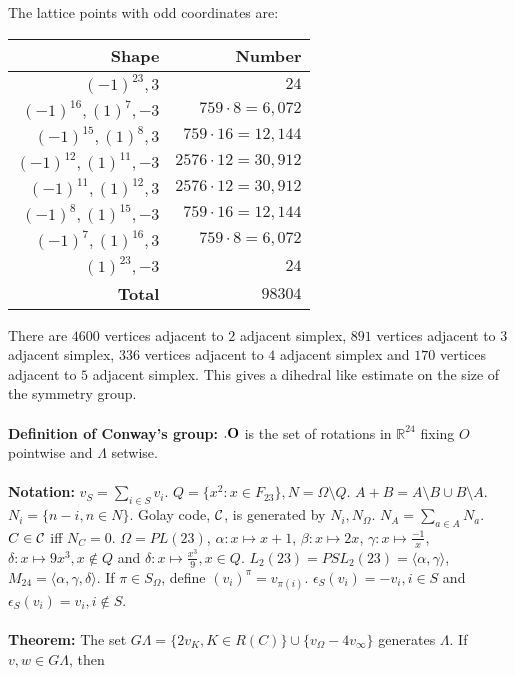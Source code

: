 The lattice points with odd coordinates are:
\begin{center}
\begin{tabular} {|r|r|}
\hline
{\bf Shape} & {\bf Number} \\
\hline
$(-1)^{23}, 3$ & $24$ \\
$(-1)^{16}, (1)^{7}, -3$ & $759 \cdot 8= 6,072$ \\
$(-1)^{15}, (1)^{8}, 3$ & $759 \cdot 16= 12,144$ \\
$(-1)^{12}, (1)^{11}, -3$ & $2576 \cdot 12= 30,912$ \\
$(-1)^{11}, (1)^{12}, 3$ & $2576 \cdot 12= 30,912$ \\
$(-1)^{8}, (1)^{15}, -3$ & $759 \cdot 16= 12,144$ \\
$(-1)^{7}, (1)^{16}, 3$ & $759 \cdot 8= 6,072$ \\
$(1)^{23}, -3$ & $24$ \\
\hline
{\bf Total} & $98304$\\
\hline
\end{tabular}
\end{center}
There are 
$4600$ vertices adjacent to $2$ adjacent simplex,
$891$ vertices adjacent to $3$ adjacent simplex,
$336$ vertices adjacent to $4$ adjacent simplex and
$170$ vertices adjacent to $5$ adjacent simplex.  
This gives a dihedral like estimate on the size of the symmetry group.
\\
\\
{\bf Definition of
Conway's group:} ${\bf .O}$ is the set of rotations in ${\mathbb R}^{24}$ fixing $O$ 
pointwise and $\Lambda$ setwise.
\\
\\
{\bf Notation:}
$v_S= \sum_{i \in S} v_i$. 
$Q= \{ x^2: x \in F_{23} \}, N= \Omega \setminus Q$.
$A+B= A \setminus B \cup B \setminus A$.  $N_i= \{ n-i, n \in N \}$.  Golay code,
${\cal C}$, is
generated by $N_i, N_{\Omega}$.  $N_A = \sum_{a \in A} N_a$.  $C \in {\cal C}$ iff $N_C=0$.
$\Omega= PL(23)$, $\alpha: x \mapsto x+1$, $\beta: x \mapsto 2x$,
$\gamma: x \mapsto {\frac {-1} x}$, 
$\delta: x \mapsto 9 x^3, x \notin Q$ and
$\delta: x \mapsto {\frac {x^3} 9}, x \in Q$.  
$L_2(23)= PSL_2(23)= \langle \alpha, \gamma \rangle$,
$M_{24}= \langle \alpha, \gamma, \delta \rangle$.  If $\pi \in S_{\Omega}$, define
$(v_i)^{\pi} = v_{\pi(i)}$.  
$\epsilon_S(v_i) = -v_i, i \in S$ and
$\epsilon_S(v_i) = v_i, i \notin S$.
\\
\\
{\bf Theorem:}
The set $G \Lambda = \{ 2 v_K, K \in R(C) \} \cup
\{ v_{\Omega} - 4 v_{\infty} \}$ generates $\Lambda$.  If $v, w \in G \Lambda$, then
